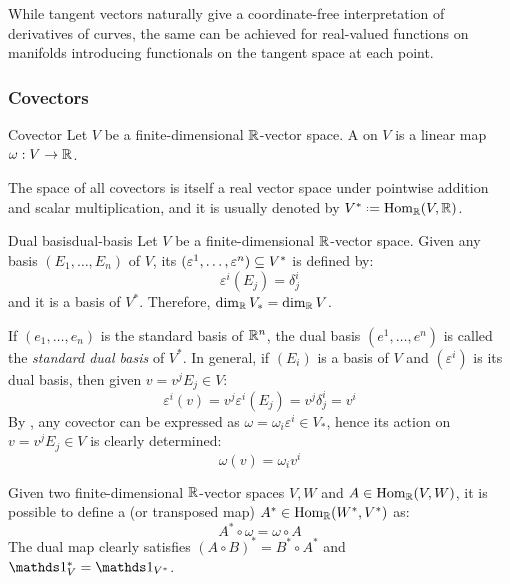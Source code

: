 While tangent vectors naturally give a coordinate-free interpretation of derivatives of curves, the same can be achieved for real-valued functions on manifolds introducing functionals on the tangent space at each point.

\subsubsection{Covectors}

\begin{definition}{Covector}{}
  Let $ V $ be a finite-dimensional $ \mathbb{R} $-vector space. A  on $ V $ is a linear map $ \omega : V \rightarrow \mathbb{R} $.
\end{definition}

The space of all covectors is itself a real vector space under pointwise addition and scalar multiplication, and it is usually denoted by $ V^* \defeq \Hom_\R(V,\R) $.

\begin{proposition}{Dual basis}{dual-basis}
  Let $ V $ be a finite-dimensional $ \mathbb{R} $-vector space. Given any basis $ (E_1 , \dots , E_n) $ of $ V $, its  $ (\varepsilon^1 , \dots , \varepsilon^n) \subseteq V^* $ is defined by:
  \begin{equation}
    \varepsilon^i(E_j) = \delta^i_j
  \end{equation}
  and it is a basis of $ V^* $. Therefore, $ \dim_{\mathbb{R}} V_* = \dim_{\mathbb{R}} V $.
\end{proposition}

If $ (e_1 , \dots , e_n) $ is the standard basis of $ \mathbb{R}^n $, the dual basis $ (e^1 , \dots , e^n) $ is called the \emph{standard dual basis} of $ V^* $. In general, if $ (E_i) $ is a basis of $ V $ and $ (\varepsilon^i) $ is its dual basis, then given $ v = v^j E_j \in V $:
\begin{equation*}
  \varepsilon^i(v) = v^j \varepsilon^i(E_j) = v^j \delta^i_j = v^i
\end{equation*}
By , any covector can be expressed as $ \omega = \omega_i \varepsilon^i \in V_* $, hence its action on $ v = v^j E_j \in V $ is clearly determined:
\begin{equation}
  \omega(v) = \omega_i v^i
\end{equation}

Given two finite-dimensional $ \mathbb{R} $-vector spaces $ V,W $ and $ A \in \operatorname{Hom}_{\mathbb{R}}(V,W) $, it is possible to define a  (or transposed map) $ A^* \in \operatorname{Hom}_{\mathbb{R}}(W^* , V^*) $ as:
\begin{equation}
  A^* \circ \omega = \omega \circ A
\end{equation}
The dual map clearly satisfies $ (A \circ B)^* = B^* \circ A^* $ and $ \id_V^* = \id_{V^*} $.

